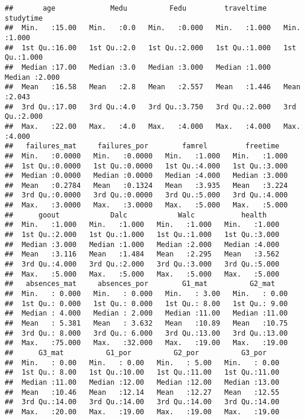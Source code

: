 \documentclass[
]{article}
\begin{document}
\begin{verbatim}
##       age             Medu          Fedu         traveltime      studytime    
##  Min.   :15.00   Min.   :0.0   Min.   :0.000   Min.   :1.000   Min.   :1.000  
##  1st Qu.:16.00   1st Qu.:2.0   1st Qu.:2.000   1st Qu.:1.000   1st Qu.:1.000  
##  Median :17.00   Median :3.0   Median :3.000   Median :1.000   Median :2.000  
##  Mean   :16.58   Mean   :2.8   Mean   :2.557   Mean   :1.446   Mean   :2.043  
##  3rd Qu.:17.00   3rd Qu.:4.0   3rd Qu.:3.750   3rd Qu.:2.000   3rd Qu.:2.000  
##  Max.   :22.00   Max.   :4.0   Max.   :4.000   Max.   :4.000   Max.   :4.000  
##   failures_mat     failures_por        famrel         freetime    
##  Min.   :0.0000   Min.   :0.0000   Min.   :1.000   Min.   :1.000  
##  1st Qu.:0.0000   1st Qu.:0.0000   1st Qu.:4.000   1st Qu.:3.000  
##  Median :0.0000   Median :0.0000   Median :4.000   Median :3.000  
##  Mean   :0.2784   Mean   :0.1324   Mean   :3.935   Mean   :3.224  
##  3rd Qu.:0.0000   3rd Qu.:0.0000   3rd Qu.:5.000   3rd Qu.:4.000  
##  Max.   :3.0000   Max.   :3.0000   Max.   :5.000   Max.   :5.000  
##      goout            Dalc            Walc           health     
##  Min.   :1.000   Min.   :1.000   Min.   :1.000   Min.   :1.000  
##  1st Qu.:2.000   1st Qu.:1.000   1st Qu.:1.000   1st Qu.:3.000  
##  Median :3.000   Median :1.000   Median :2.000   Median :4.000  
##  Mean   :3.116   Mean   :1.484   Mean   :2.295   Mean   :3.562  
##  3rd Qu.:4.000   3rd Qu.:2.000   3rd Qu.:3.000   3rd Qu.:5.000  
##  Max.   :5.000   Max.   :5.000   Max.   :5.000   Max.   :5.000  
##   absences_mat     absences_por        G1_mat          G2_mat     
##  Min.   : 0.000   Min.   : 0.000   Min.   : 3.00   Min.   : 0.00  
##  1st Qu.: 0.000   1st Qu.: 0.000   1st Qu.: 8.00   1st Qu.: 9.00  
##  Median : 4.000   Median : 2.000   Median :11.00   Median :11.00  
##  Mean   : 5.381   Mean   : 3.632   Mean   :10.89   Mean   :10.75  
##  3rd Qu.: 8.000   3rd Qu.: 6.000   3rd Qu.:13.00   3rd Qu.:13.00  
##  Max.   :75.000   Max.   :32.000   Max.   :19.00   Max.   :19.00  
##      G3_mat          G1_por          G2_por          G3_por     
##  Min.   : 0.00   Min.   : 0.00   Min.   : 5.00   Min.   : 0.00  
##  1st Qu.: 8.00   1st Qu.:10.00   1st Qu.:11.00   1st Qu.:11.00  
##  Median :11.00   Median :12.00   Median :12.00   Median :13.00  
##  Mean   :10.46   Mean   :12.14   Mean   :12.27   Mean   :12.55  
##  3rd Qu.:14.00   3rd Qu.:14.00   3rd Qu.:14.00   3rd Qu.:14.00  
##  Max.   :20.00   Max.   :19.00   Max.   :19.00   Max.   :19.00
\end{verbatim}
\end{document}

